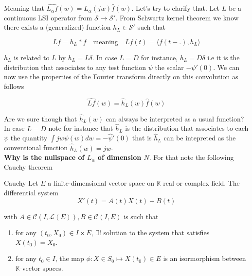 \documentclass[a4paper, 11pt]{article}
\begin{document}
Meaning that $\widehat{L_{\alpha}f}(w) = L_{\alpha}(jw) \hat{f}(w)$. Let's try to clarify that. Let $L$ be a continuous 
LSI operator from $\mathcal{S} \to \mathcal{S}'$. From Schwartz kernel theorem we know there exists a (generalized) 
function $h_L \in \mathcal{S}'$ such that

\begin{equation*}
  L{f} = h_L*f \quad \text{meaning} \quad L{f}(t) = \langle f(t-.), h_L \rangle
\end{equation*}

$h_L$ is related to $L$ by $h_L = L{\delta}$. In case $L=D$ for instance, $h_L = D{\delta}$ i.e it is the distribution 
that associates to any test function $\psi$ the scalar $-\psi'(0)$. We can now use the properties of the Fourier 
transform directly on this convolution as follows

\begin{equation*}
  \widehat{L{f}}(w) = \hat{h}_L(w) \hat{f}(w)
\end{equation*}

Are we sure though that $\hat{h}_L(w)$ can always be interpreted as a usual function? In case $L=D$ note for instance 
that $\hat{h}_L$ is the distribution that associates to each $\psi$ the quantity $\int jw \psi(w)dw = -\hat{\psi}'(0)$ 
that is $\hat{h}_L$ can be intepreted as the conventional function $\hat{h}_L(w)= jw$. \\

\textbf{Why is the nullspace of $L_{\alpha}$ of dimension $N$}. For that note the following Cauchy theorem 

\begin{thm}{Cauchy}
  Let $E$ a finite-dimensional vector space on $\mathbb{K}$ real or complex field. The differential 
  system
  \begin{equation*}
    X'(t) = A(t) X(t) + B(t)
  \end{equation*}

  with $A \in \mathcal{C}(I, \mathcal{L}(E)), B \in \mathcal{C}(I, E)$ is such that
  \begin{enumerate}
    \item for any $(t_0, X_0) \in I\times E$, $\exists$! solution to the system that satisfies $X(t_0) = X_0$.
    \item for any $t_0 \in I$, the map $\phi: X \in S_0 \mapsto X(t_0) \in E$ is an isormorphism between 
      $\mathbb{K}$-vector spaces.
  \end{enumerate}
\end{thm}
\end{document}
